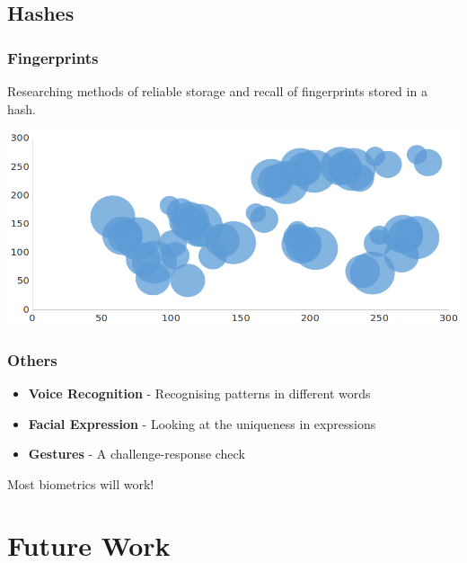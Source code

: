 \documentclass{beamer}
\begin{document}
    \subsection{Hashes}
      \begin{frame}
        \frametitle{Fingerprints}
        Researching methods of reliable storage and recall of fingerprints
        stored in a hash.
        \vfill
        \begin{center}
          \includegraphics[scale=0.3]{finger-graph}
        \end{center}
      \end{frame}
      \begin{frame}
        \frametitle{Others}
        \begin{itemize}
          \item \textbf{Voice Recognition} - Recognising patterns in different
                words
          \item \textbf{Facial Expression} - Looking at the uniqueness in
                expressions
          \item \textbf{Gestures} - A challenge-response check
        \end{itemize}
        \vfill
        Most biometrics will work!
      \end{frame}
  \section{Future Work}
\end{document}
